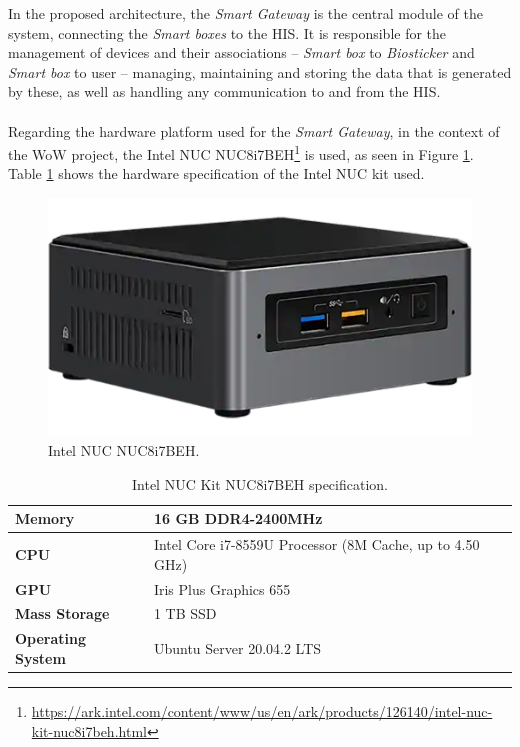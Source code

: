 In the proposed architecture, the \textit{Smart Gateway} is the central module of the system, connecting the \textit{Smart boxes} to the \acs{HIS}. It is responsible for the management of devices and their associations -- \textit{Smart box} to \textit{Biosticker} and \textit{Smart box} to user -- managing, maintaining and storing the data that is generated by these, as well as handling any communication to and from the \acs{HIS}. 


\paragraph{} Regarding the hardware platform used for the \textit{Smart Gateway}, in the context of the \acs{WoW} project, the Intel NUC NUC8i7BEH\footnote{\url{https://ark.intel.com/content/www/us/en/ark/products/126140/intel-nuc-kit-nuc8i7beh.html}} is used, as seen in Figure \ref{fig:gateway_image}. Table \ref{tab:NUCspecification} shows the hardware specification of the Intel NUC kit used.


\begin{figure}[H]
    \centering
    \includegraphics[width=0.4\linewidth]{images/gateway-image.png}
    \caption[Intel NUC NUC8i7BEH.]{Intel NUC NUC8i7BEH.}
    \label{fig:gateway_image}
\end{figure}

\begin{table}[H]
    \centering
    \caption{Intel NUC Kit NUC8i7BEH specification.}
    \label{tab:NUCspecification}
    \begin{tabular}{l|l}
    \hline
     \textbf{Memory}                     & 16 GB DDR4-2400MHz                                   \\ \hline
     \textbf{CPU}                        & Intel Core i7-8559U Processor (8M Cache, up to 4.50 GHz) \\ \hline
     \textbf{GPU}                         & Iris Plus Graphics 655                                     \\ \hline
     \textbf{Mass Storage}               & 1 TB SSD                                                      \\ \hline %
     \textbf{Operating System}           & Ubuntu Server 20.04.2 LTS                                  \\ \hline
    \end{tabular}
\end{table}

